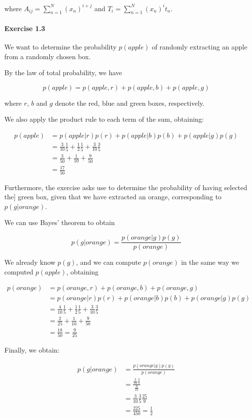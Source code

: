 where $A_{ij} = \sum_{n=1}^N (x_n)^{i+j}$ and $T_i = \sum_{n=1}^N (x_n)^it_n$.


\paragraph{Exercise 1.3}

We want to determine the probability $p(apple)$ of randomly extracting an apple from
a randomly chosen box.

By the law of total probability, we have

\begin{equation*}
    p(apple) = p(apple, r) + p(apple, b) + p(apple, g)
\end{equation*}

where $r$, $b$ and $g$ denote the red, blue and green boxes, respectively.

We also apply the product rule to each term of the sum, obtaining:

\begin{align*}
    p(apple) &= p(apple|r)p(r) + p(apple|b)p(b) + p(apple|g)p(g)\\
    &= \frac{3}{10}\frac{1}{5} + \frac{1}{2}\frac{1}{5} + \frac{3}{10}\frac{3}{5}\\
    &= \frac{3}{50} + \frac{1}{10} + \frac{9}{50}\\
    &= \frac{17}{50}
\end{align*}

Furthermore, the exercise asks use to determine the probability of having selected the]
green box, given that we have extracted an orange, corresponding to $p(g|orange)$.

We can use Bayes' theorem to obtain

\begin{equation*}
    p(g|orange) = \frac{p(orange|g)p(g)}{p(orange)}
\end{equation*}

We already know $p(g)$, and we can compute $p(orange)$ in the same way we computed $p(apple)$,
obtaining

\begin{align*}
    p(orange) &= p(orange, r) + p(orange, b) + p(orange, g)\\
    &= p(orange|r)p(r) + p(orange|b)p(b) + p(orange|g)p(g)\\
    &= \frac{4}{10}\frac{1}{5} + \frac{1}{2}\frac{1}{5} + \frac{3}{10}\frac{3}{5}\\
    &= \frac{2}{25} + \frac{1}{10} + \frac{9}{50}\\
    &= \frac{18}{50} = \frac{9}{25}
\end{align*}

Finally, we obtain:

\begin{align*}
    p(g|orange) &= \frac{p(orange|g)p(g)}{p(orange)}\\
    &= \frac{\frac{3}{10}\frac{3}{5}}{\frac{9}{25}}\\
    &= \frac{3}{10}\frac{3}{5}\frac{25}{9}\\
    &= \frac{225}{450} = \frac{1}{2}
\end{align*}